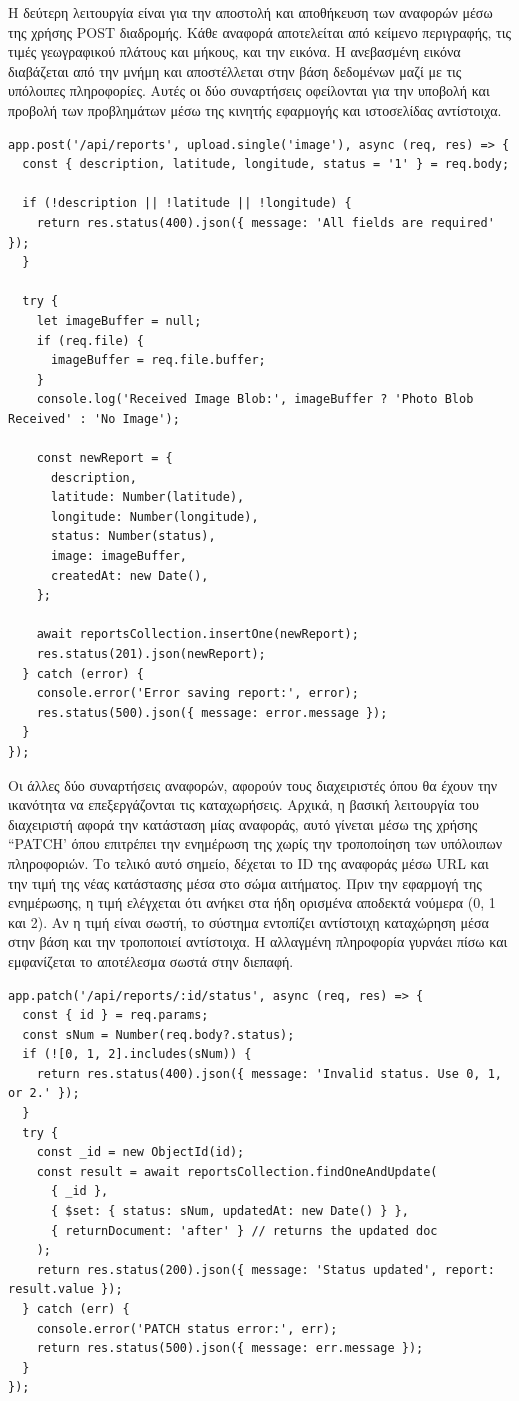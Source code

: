 Η δεύτερη λειτουργία είναι για την αποστολή και αποθήκευση των αναφορών μέσω της χρήσης POST διαδρομής. Κάθε αναφορά αποτελείται από κείμενο περιγραφής, τις τιμές γεωγραφικού πλάτους και μήκους, και την εικόνα. Η ανεβασμένη εικόνα διαβάζεται από την μνήμη και αποστέλλεται στην βάση δεδομένων μαζί με τις υπόλοιπες πληροφορίες. Αυτές οι δύο συναρτήσεις οφείλονται για την υποβολή και προβολή των προβλημάτων μέσω της κινητής εφαρμογής και ιστοσελίδας αντίστοιχα.
\\
\begin{lstlisting}
app.post('/api/reports', upload.single('image'), async (req, res) => {
  const { description, latitude, longitude, status = '1' } = req.body;

  if (!description || !latitude || !longitude) {
    return res.status(400).json({ message: 'All fields are required' });
  }

  try {
    let imageBuffer = null;
    if (req.file) {
      imageBuffer = req.file.buffer;
    }
    console.log('Received Image Blob:', imageBuffer ? 'Photo Blob Received' : 'No Image');

    const newReport = {
      description,
      latitude: Number(latitude),
      longitude: Number(longitude),
      status: Number(status),
      image: imageBuffer,
      createdAt: new Date(),
    };
    
    await reportsCollection.insertOne(newReport);
    res.status(201).json(newReport);
  } catch (error) {
    console.error('Error saving report:', error);
    res.status(500).json({ message: error.message });
  }
});
\end{lstlisting}

Οι άλλες δύο συναρτήσεις αναφορών, αφορούν τους διαχειριστές όπου θα έχουν την ικανότητα να επεξεργάζονται τις καταχωρήσεις. Αρχικά, η βασική λειτουργία του διαχειριστή αφορά την κατάσταση μίας αναφοράς, αυτό γίνεται μέσω της χρήσης “PATCH’ όπου επιτρέπει την ενημέρωση της χωρίς την τροποποίηση των υπόλοιπων πληροφοριών. Το τελικό αυτό σημείο, δέχεται το ID της αναφοράς μέσω URL και την τιμή της νέας κατάστασης μέσα στο σώμα αιτήματος. Πριν την εφαρμογή της ενημέρωσης, η τιμή ελέγχεται ότι ανήκει στα ήδη ορισμένα αποδεκτά νούμερα (0, 1 και 2). Αν η τιμή είναι σωστή, το σύστημα εντοπίζει αντίστοιχη καταχώρηση μέσα στην βάση και την τροποποιεί αντίστοιχα. Η αλλαγμένη πληροφορία γυρνάει πίσω και εμφανίζεται το αποτέλεσμα σωστά στην διεπαφή.
\\
\begin{lstlisting}
app.patch('/api/reports/:id/status', async (req, res) => {
  const { id } = req.params;
  const sNum = Number(req.body?.status);
  if (![0, 1, 2].includes(sNum)) {
    return res.status(400).json({ message: 'Invalid status. Use 0, 1, or 2.' });
  }
  try {
    const _id = new ObjectId(id);
    const result = await reportsCollection.findOneAndUpdate(
      { _id },
      { $set: { status: sNum, updatedAt: new Date() } },
      { returnDocument: 'after' } // returns the updated doc
    );
    return res.status(200).json({ message: 'Status updated', report: result.value });
  } catch (err) {
    console.error('PATCH status error:', err);
    return res.status(500).json({ message: err.message });
  }
});
\end{lstlisting}


